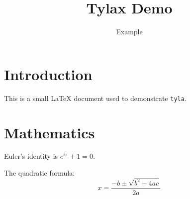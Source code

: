 \documentclass{article}
\title{Tylax Demo}
\author{Example}
\begin{document}
\maketitle

\section{Introduction}
This is a small LaTeX document used to demonstrate \texttt{tyla}.

\section{Mathematics}
Euler's identity is $e^{i\pi} + 1 = 0$.

The quadratic formula:
\begin{equation}
  x = \frac{-b \pm \sqrt{b^2 - 4ac}}{2a}
\end{equation}
\end{document}
